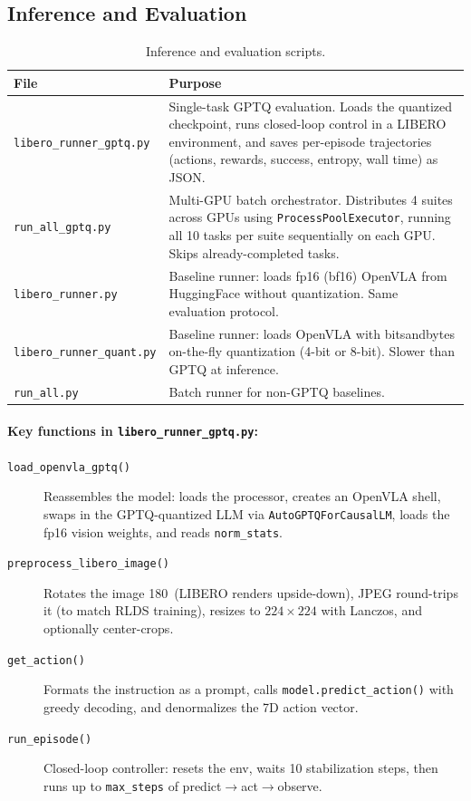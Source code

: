 \documentclass[11pt,a4paper]{article}
\begin{document}
\subsection{Inference and Evaluation}

\begin{table}[h]
\centering
\begin{tabular}{@{}p{5cm}p{9.5cm}@{}}
\toprule
\textbf{File} & \textbf{Purpose} \\
\midrule
\texttt{libero\_runner\_gptq.py} & Single-task GPTQ evaluation. Loads the quantized checkpoint, runs closed-loop control in a LIBERO environment, and saves per-episode trajectories (actions, rewards, success, entropy, wall time) as JSON. \\
\texttt{run\_all\_gptq.py} & Multi-GPU batch orchestrator. Distributes 4 suites across GPUs using \texttt{ProcessPoolExecutor}, running all 10 tasks per suite sequentially on each GPU. Skips already-completed tasks. \\
\midrule
\texttt{libero\_runner.py} & Baseline runner: loads fp16 (bf16) OpenVLA from HuggingFace without quantization. Same evaluation protocol. \\
\texttt{libero\_runner\_quant.py} & Baseline runner: loads OpenVLA with bitsandbytes on-the-fly quantization (4-bit or 8-bit). Slower than GPTQ at inference. \\
\texttt{run\_all.py} & Batch runner for non-GPTQ baselines. \\
\bottomrule
\end{tabular}
\caption{Inference and evaluation scripts.}
\end{table}

\paragraph{Key functions in \texttt{libero\_runner\_gptq.py}:}
\begin{description}
  \item[\texttt{load\_openvla\_gptq()}] Reassembles the model: loads the processor, creates an OpenVLA shell, swaps in the GPTQ-quantized LLM via \texttt{AutoGPTQForCausalLM}, loads the fp16 vision weights, and reads \texttt{norm\_stats}.
  \item[\texttt{preprocess\_libero\_image()}] Rotates the image 180\textdegree\ (LIBERO renders upside-down), JPEG round-trips it (to match RLDS training), resizes to $224\times224$ with Lanczos, and optionally center-crops.
  \item[\texttt{get\_action()}] Formats the instruction as a prompt, calls \texttt{model.predict\_action()} with greedy decoding, and denormalizes the 7D action vector.
  \item[\texttt{run\_episode()}] Closed-loop controller: resets the env, waits 10 stabilization steps, then runs up to \texttt{max\_steps} of predict$\rightarrow$act$\rightarrow$observe.
\end{description}
\end{document}
